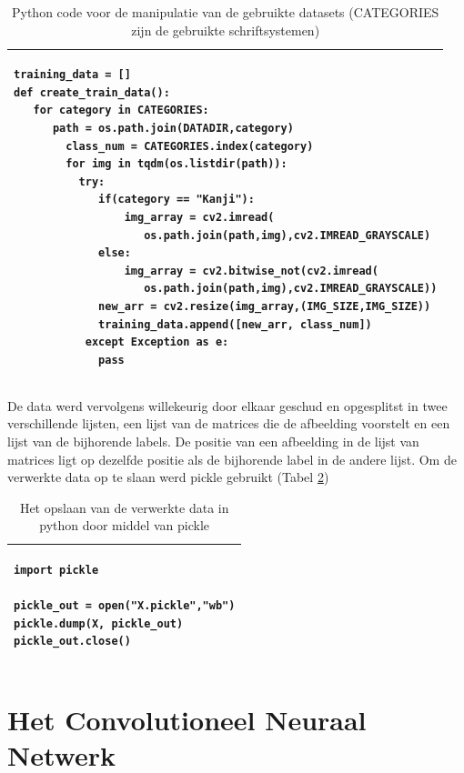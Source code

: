 \begin{table}[!htbp]
    \begin{tabular}{|l|}
        \hline
        \begin{lstlisting}
training_data = []
def create_train_data():
   for category in CATEGORIES: 
      path = os.path.join(DATADIR,category) 
        class_num = CATEGORIES.index(category)
        for img in tqdm(os.listdir(path)): 
          try:
             if(category == "Kanji"):
                 img_array = cv2.imread(
                    os.path.join(path,img),cv2.IMREAD_GRAYSCALE) 
             else:
                 img_array = cv2.bitwise_not(cv2.imread(
                    os.path.join(path,img),cv2.IMREAD_GRAYSCALE))
             new_arr = cv2.resize(img_array,(IMG_SIZE,IMG_SIZE))
             training_data.append([new_arr, class_num])
           except Exception as e:
             pass
        \end{lstlisting}
        \\ \hline
    \end{tabular}
    \caption{Python code voor de manipulatie van de gebruikte datasets (CATEGORIES zijn de gebruikte schriftsystemen) }\label{table:DataManipulation}
\end{table}

De data werd vervolgens willekeurig door elkaar geschud en opgesplitst in twee verschillende lijsten, een lijst van de matrices die de afbeelding voorstelt en een lijst van de bijhorende labels. De positie van een afbeelding in de lijst van matrices ligt op dezelfde positie als de bijhorende label in de andere lijst.
Om de verwerkte data op te slaan werd pickle gebruikt (Tabel \ref{table:DataSave})


\begin{table}[!htbp]
    \begin{tabular}{|l|}
        \hline
        \begin{lstlisting}
import pickle
       
pickle_out = open("X.pickle","wb")
pickle.dump(X, pickle_out)
pickle_out.close()
        \end{lstlisting}
        \\ \hline
    \end{tabular}
    \caption{Het opslaan van de verwerkte data in python door middel van pickle }\label{table:DataSave}
\end{table}

\section{Het Convolutioneel Neuraal Netwerk}

